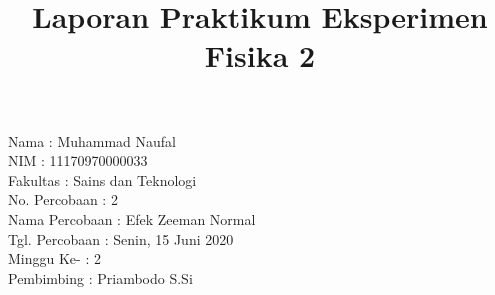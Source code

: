 \documentclass{article}
\title{Laporan Praktikum Eksperimen Fisika 2}
\author{  }
\date{  }
\begin{document}
	\begin{titlepage}
		\huge\maketitle 
		\thispagestyle{empty} 
		\noindent \huge{Nama\hspace{3.7cm} : Muhammad Naufal}\\
		\huge{NIM\hspace{4.1cm} : 11170970000033}\\
		\huge{Fakultas\hspace{2.96cm} : Sains dan Teknologi}\\
		\huge{No. Percobaan\hspace{1.07cm} : 2}\\
		\huge{Nama Percobaan \hspace{0.4cm} : Efek Zeeman Normal}\\
		\huge{Tgl. Percobaan \hspace{0.62cm} : Senin, 15 Juni 2020}\\
		\huge{Minggu Ke- \hspace{1.65cm} : 2}\\
		\huge{Pembimbing \hspace{1.46cm} : Priambodo S.Si}
	\end{titlepage}
\end{document}
